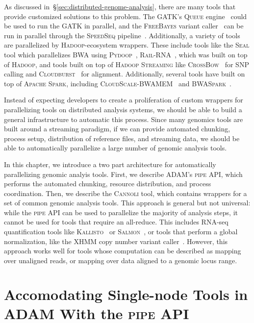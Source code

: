 \documentclass[phd]{ucbthesis}
\begin{document}
As discussed in~\S\ref{sec:distributed-genome-analysis}, there are many tools
that provide customized solutions to this problem. The GATK's \textsc{Queue}
engine~\cite{depristo11} could be used to run the GATK in parallel, and the
\textsc{FreeBayes} variant caller~\cite{garrison12} can be run in parallel
through the \textsc{SpeedSeq} pipeline~\cite{chiang15}. Additionally, a variety
of tools are parallelized by \textsc{Hadoop}-ecosystem wrappers. These include
tools like the \textsc{Seal} tool which parallelizes \textsc{BWA} using
\textsc{Pydoop}~\cite{leo10, pireddu11}, \textsc{Rail-RNA}~\cite{nellore16},
which was built on top of \textsc{Hadoop}, and tools built on top of
\textsc{Hadoop Streaming} like \textsc{CrossBow}~\cite{langmead09crossbow} for
SNP calling and \textsc{Cloudburst}~\cite{schatz09} for alignment.
Additionally, several tools have built on top of \textsc{Apache Spark},
including \textsc{CloudScale-BWAMEM}~\cite{chen16} and
\textsc{BWASpark}~\cite{abuin16}.

Instead of expecting developers to create a proliferation of custom wrappers for
parallelizing tools on distributed analysis systems, we should be able to build
a general infrastructure to automatic this process. Since many genomics tools
are built around a streaming paradigm, if we can provide automated chunking,
process setup, distribution of reference files, and streaming data, we should
be able to automatically parallelize a large number of genomic analysis tools.

In this chapter, we introduce a two part architecture for automatically
parallelizing genomic analyis tools. First, we describe ADAM's \textsc{pipe}
API, which performs the automated chunking, resource distribution, and process
coordination. Then, we describe the \textsc{Cannoli} tool, which contains
wrappers for a set of common genomic analysis tools. This approach is general
but not universal: while the \textsc{pipe} API can be used to parallelize the
majority of analysis steps, it cannot be used for tools that require an
all-reduce. This includes RNA-seq quantification tools like
\textsc{Kallisto}~\cite{bray16} or \textsc{Salmon}~\cite{patro17}, or tools
that perform a global normalization, like the XHMM copy number variant
caller~\cite{fromer12}. However, this approach works well for tools whose
computation can be described as mapping over unaligned reads, or mapping over
data aligned to a genomic locus range.

\section{Accomodating Single-node Tools in \textsc{ADAM} With the \textsc{pipe} API}
\label{sec:pipe-api}
\end{document}

